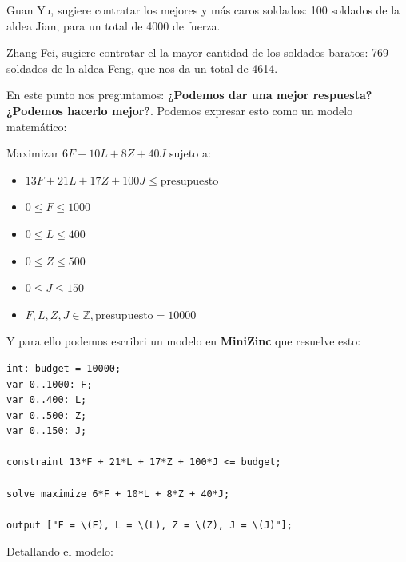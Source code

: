\documentclass[12pt]{article}
\begin{document}
\begin{justify}
Guan Yu, sugiere contratar los mejores y más caros soldados: 100 soldados de la aldea Jian, para un total de 4000 de fuerza.
\end{justify}

\begin{justify}
Zhang Fei, sugiere contratar el la mayor cantidad de los soldados baratos: 769 soldados de la aldea Feng, que nos da un total de 4614.
\end{justify}

\begin{justify}
En este punto nos preguntamos: \textbf{¿Podemos dar una mejor respuesta? ¿Podemos hacerlo mejor?}. Podemos expresar esto como un modelo matemático:
\end{justify}

\begin{justify}
Maximizar $6F + 10L + 8Z + 40J$ sujeto a:
\end{justify}

\begin{itemize}
\item $13F + 21L + 17Z + 100J \leq \text{presupuesto}$
\item $0 \leq F \leq 1000$
\item $0 \leq L \leq 400$
\item $0 \leq Z \leq 500$
\item $0 \leq J \leq 150$
\item $F, L, Z, J \in \mathbb{Z}, \text{presupuesto} = 10000$
\end{itemize}

\begin{justify}
Y para ello podemos escribri un modelo en \textbf{MiniZinc} que resuelve esto:
\end{justify}

\begin{Verbatim}
int: budget = 10000;
var 0..1000: F;
var 0..400: L;
var 0..500: Z;
var 0..150: J;

constraint 13*F + 21*L + 17*Z + 100*J <= budget;

solve maximize 6*F + 10*L + 8*Z + 40*J;

output ["F = \(F), L = \(L), Z = \(Z), J = \(J)"];

\end{Verbatim}

\begin{justify}
Detallando el modelo:
\end{justify}
\end{document}
